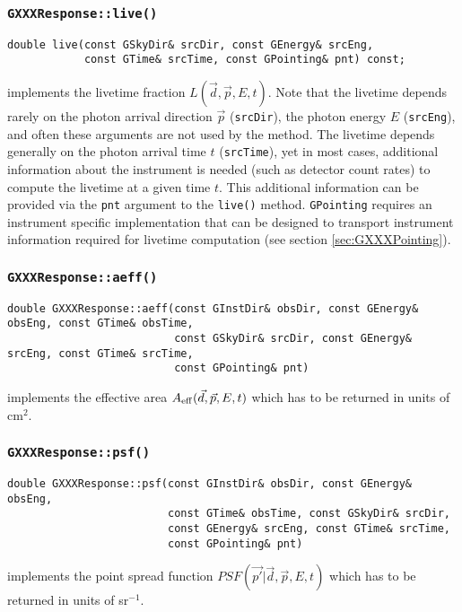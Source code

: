 \documentclass{article}[12pt,a4]
\begin{document}
\subsubsection{{\tt GXXXResponse::live()}}
\label{sec:GXXXResponse::live}

\begin{verbatim}
double live(const GSkyDir& srcDir, const GEnergy& srcEng,
            const GTime& srcTime, const GPointing& pnt) const;
\end{verbatim}
implements the livetime fraction $L(\vec{d}, \vec{p}, E, t)$.
Note that the livetime depends rarely on the photon arrival direction $\vec{p}$ ({\tt srcDir}),
the photon energy $E$ ({\tt srcEng}), and often these arguments are not used by the
method.
The livetime depends generally on the photon arrival time $t$ ({\tt srcTime}), yet in most
cases, additional information about the instrument is needed (such as detector count rates)
to compute the livetime at a given time $t$.
This additional information can be provided via the {\tt pnt} argument to the
{\tt live()} method.
{\tt GPointing} requires an instrument specific implementation that can be designed
to transport instrument information required for livetime computation 
(see section \ref{sec:GXXXPointing}).


\subsubsection{{\tt GXXXResponse::aeff()}}

\begin{verbatim}
double GXXXResponse::aeff(const GInstDir& obsDir, const GEnergy& obsEng, const GTime& obsTime,
                          const GSkyDir& srcDir, const GEnergy& srcEng, const GTime& srcTime,
                          const GPointing& pnt)
\end{verbatim}
implements the effective area $A_{\rm eff}(\vec{d}, \vec{p}, E, t)$ which has to be returned
in units of cm$^2$.


\subsubsection{{\tt GXXXResponse::psf()}}

\begin{verbatim}
double GXXXResponse::psf(const GInstDir& obsDir, const GEnergy& obsEng,
                         const GTime& obsTime, const GSkyDir& srcDir,
                         const GEnergy& srcEng, const GTime& srcTime,
                         const GPointing& pnt)
\end{verbatim}
implements the point spread function $PSF(\vec{p'} | \vec{d}, \vec{p}, E, t)$ which has to be returned
in units of sr$^{-1}$.
\end{document}
